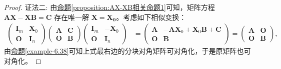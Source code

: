 \documentclass[../../main.tex]{subfiles}%
\begin{document}
\begin{proof}
{\color{blue}证法二:}
由\hyperref[proposition:AX-XB相关命题1]{命题\ref{proposition:AX-XB相关命题1}}可知，矩阵方程 \(\boldsymbol{AX - XB = C}\) 存在唯一解 \(\boldsymbol{X = X_0}\)。考虑如下相似变换：
\begin{align*}
\begin{pmatrix}
\boldsymbol{I}_m & \boldsymbol{X}_0 \\
\boldsymbol{O} & \boldsymbol{I}_n
\end{pmatrix}
\begin{pmatrix}
\boldsymbol{A} & \boldsymbol{C} \\
\boldsymbol{O} & \boldsymbol{B}
\end{pmatrix}
\begin{pmatrix}
\boldsymbol{I}_m & -\boldsymbol{X}_0 \\
\boldsymbol{O} & \boldsymbol{I}_n
\end{pmatrix}
&=
\begin{pmatrix}
\boldsymbol{A} & -\boldsymbol{AX}_0 + \boldsymbol{X}_0\boldsymbol{B} + \boldsymbol{C} \\
\boldsymbol{O} & \boldsymbol{B}
\end{pmatrix}
=
\begin{pmatrix}
\boldsymbol{A} & \boldsymbol{O} \\
\boldsymbol{O} & \boldsymbol{B}
\end{pmatrix},
\end{align*}
由\hyperref[example-6.38]{命题\ref{example-6.38}}可知上式最右边的分块对角矩阵可对角化，于是原矩阵也可对角化。
\end{proof}
\end{document}
